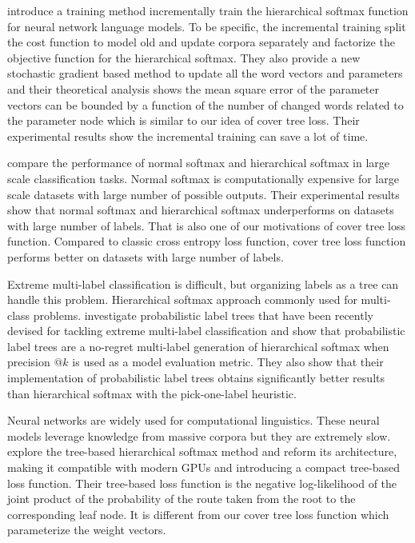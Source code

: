 \documentclass[twoside]{article}
\theoremstyle{definition}
\begin{document}
\cite{Peng2017IncrementallyLT} introduce a training method incrementally train the hierarchical softmax function for neural network language models. 
To be specific, the incremental training split the cost function to model old and update corpora separately and factorize the objective function for the hierarchical softmax. 
They also provide a new stochastic gradient based method to update all the word vectors and parameters and their theoretical analysis shows the mean square error of the parameter vectors can be bounded by a function of the number of changed words related to the parameter node which is similar to our idea of cover tree loss.
Their experimental results show the incremental training can save a lot of time.

\cite{Mohammed2018EffectivenessOH} compare the performance of normal softmax and hierarchical softmax in large scale classification tasks. 
Normal softmax is computationally expensive for large scale datasets with large number of possible outputs.
Their experimental results show that normal softmax and hierarchical softmax underperforms on datasets with large number of labels.
That is also one of our motivations of cover tree loss function. 
Compared to classic cross entropy loss function, cover tree loss function performs better on datasets with large number of labels.

Extreme multi-label classification is difficult, but organizing labels as a tree can handle this problem. 
Hierarchical softmax approach commonly used for multi-class problems.
\cite{Wydmuch2018ANG} investigate probabilistic label trees that have been recently devised for tackling extreme multi-label classification and show that probabilistic label trees are a no-regret multi-label generation of hierarchical softmax when precision $@k$ is used as a model evaluation metric.
They also show that their implementation of probabilistic label trees obtains significantly better results than hierarchical softmax with the pick-one-label heuristic.

Neural networks are widely used for computational linguistics.
These neural models leverage knowledge from massive corpora but they are extremely slow.
\cite{Jiang2017ExplorationOT} explore the tree-based hierarchical softmax method and reform its architecture, making it compatible
with modern GPUs and introducing a compact tree-based loss function.
Their tree-based loss function is the negative log-likelihood of the joint product of the probability of the route taken from the root to the corresponding leaf node. 
It is different from our cover tree loss function which parameterize the weight vectors. 
\end{document}
